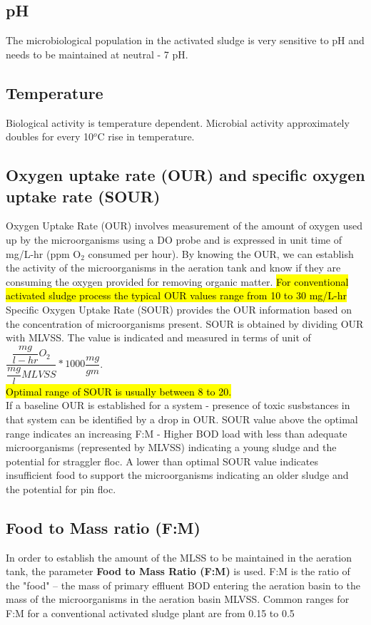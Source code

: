 \subsection{pH}%
The microbiological population in the activated sludge is very sensitive to pH and needs to be maintained at neutral - 7 pH.
\subsection{Temperature}%
Biological activity is temperature dependent.  Microbial activity approximately doubles for every 10$^o$C rise in temperature.\\
\subsection{Oxygen uptake rate (OUR) and specific oxygen uptake rate (SOUR)}%

Oxygen Uptake Rate (OUR) involves measurement of the amount of oxygen used up by the microorganisms using a DO probe and is expressed in unit time of mg/L-hr (ppm O$_2$ consumed per hour). By knowing the OUR, we can establish the activity of the microorganisms in the aeration tank and know if they are consuming the oxygen provided for removing organic matter.  \hl{For conventional activated sludge process the typical OUR values range from 10 to 30 mg/L-hr}\\

Specific Oxygen Uptake Rate (SOUR) provides the OUR information based on the concentration of microorganisms present. SOUR is obtained by dividing OUR with MLVSS. The value is indicated and measured in terms of unit of $\dfrac{\dfrac{mg}{l-hr}O_2}{\dfrac{mg}{l}MLVSS}*1000\dfrac{mg}{gm}$.\\ \hl{Optimal range of SOUR is usually between 8 to 20.}\\
If a baseline OUR is established for a system - presence of toxic susbstances in that system can be identified by a drop in OUR. SOUR value above the optimal range indicates an increasing F:M - Higher BOD load with less than adequate microorganisms (represented by MLVSS) indicating a young sludge and the potential for straggler floc.  A lower than optimal SOUR value indicates insufficient food to support the microorganisms indicating an older sludge and the potential for pin floc.

\subsection{Food to Mass ratio (F:M)}
In order to establish the amount of the MLSS to be maintained in the aeration tank, the parameter \textbf{Food to Mass Ratio (F:M)} is used.  F:M is the ratio of the "food" – the mass of primary effluent BOD entering the aeration basin to the mass of the microorganisms in the aeration basin \textemdash MLVSS.  Common ranges for F:M for a conventional activated sludge plant are from 0.15 to 0.5\\
